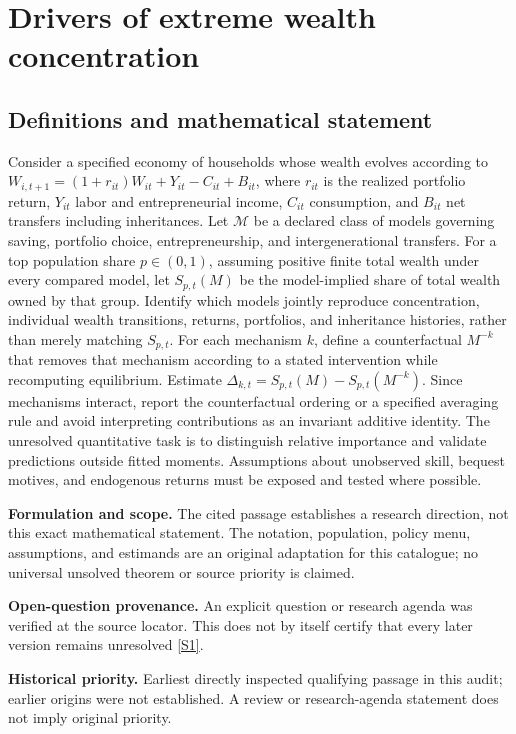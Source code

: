 \documentclass[11pt]{article}
\newcommand{\sref}[2]{\hyperlink{source:#1:#2}{[S#2]}}
\begin{document}
\section*{Drivers of extreme wealth concentration}\label{30007644}
\subsection{Definitions and mathematical statement}
Consider a specified economy of households whose wealth evolves according to \(W_{i,t+1}=(1+r_{it})W_{it}+Y_{it}-C_{it}+B_{it}\), where \(r_{it}\) is the realized portfolio return, \(Y_{it}\) labor and entrepreneurial income, \(C_{it}\) consumption, and \(B_{it}\) net transfers including inheritances. Let \(\mathcal M\) be a declared class of models governing saving, portfolio choice, entrepreneurship, and intergenerational transfers. For a top population share \(p\in(0,1)\), assuming positive finite total wealth under every compared model, let \(S_{p,t}(M)\) be the model-implied share of total wealth owned by that group. Identify which models jointly reproduce concentration, individual wealth transitions, returns, portfolios, and inheritance histories, rather than merely matching \(S_{p,t}\). For each mechanism \(k\), define a counterfactual \(M^{-k}\) that removes that mechanism according to a stated intervention while recomputing equilibrium. Estimate \(\Delta_{k,t}=S_{p,t}(M)-S_{p,t}(M^{-k})\). Since mechanisms interact, report the counterfactual ordering or a specified averaging rule and avoid interpreting contributions as an invariant additive identity. The unresolved quantitative task is to distinguish relative importance and validate predictions outside fitted moments. Assumptions about unobserved skill, bequest motives, and endogenous returns must be exposed and tested where possible.

\par\textbf{Formulation and scope.} The cited passage establishes a research direction, not this exact mathematical statement. The notation, population, policy menu, assumptions, and estimands are an original adaptation for this catalogue; no universal unsolved theorem or source priority is claimed.

\par\textbf{Open-question provenance.} An explicit question or research agenda was verified at the source locator. This does not by itself certify that every later version remains unresolved \sref{30007644}{1}.

\par\textbf{Historical priority.} Earliest directly inspected qualifying passage in this audit; earlier origins were not established. A review or research-agenda statement does not imply original priority.
\end{document}
